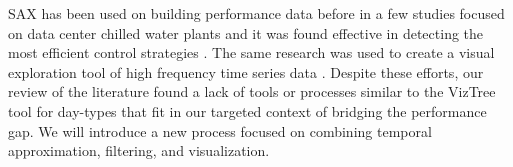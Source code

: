 SAX has been used on building performance data before in a few studies focused on data center chilled water plants and it was found effective in detecting the most efficient control strategies \cite{Patnaik:2009uk}. The same research was used to create a visual exploration tool of high frequency time series data \cite{Hao:2012go}. Despite these efforts, our review of the literature found a lack of tools or processes similar to the VizTree tool for day-types that fit in our targeted context of bridging the performance gap. We will introduce a new process focused on combining temporal approximation, filtering, and visualization.